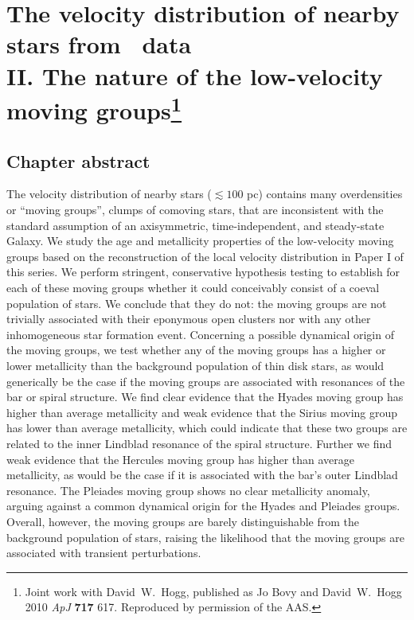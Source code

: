 
\chapter[The velocity distribution of nearby stars from \Hipparcos\ data II. The nature of the low-velocity moving groups]{The velocity distribution of nearby stars from \Hipparcos\ data\\
II. The nature of the low-velocity moving
groups\protect\footnote{Joint work with David~W.~Hogg, published as Jo
Bovy and David~W.~Hogg 2010 \emph{ApJ} {\bf 717} 617. Reproduced by
permission of the AAS.}}\label{chap:groups}

\section{Chapter abstract}
The velocity distribution of nearby stars ($\lesssim 100$ pc) contains
many overdensities or ``moving groups'', clumps of comoving stars,
that are inconsistent with the standard assumption of an axisymmetric,
time-independent, and steady-state Galaxy. We study the age and
metallicity properties of the low-velocity moving groups based on the
reconstruction of the local velocity distribution in Paper I of this
series. We perform stringent, conservative hypothesis testing to
establish for each of these moving groups whether it could conceivably
consist of a coeval population of stars. We conclude that they do not:
the moving groups are not trivially associated with their eponymous
open clusters nor with any other inhomogeneous star formation
event. Concerning a possible dynamical origin of the moving groups, we
test whether any of the moving groups has a higher or lower
metallicity than the background population of thin disk stars, as
would generically be the case if the moving groups are associated with
resonances of the bar or spiral structure. We find clear evidence that
the Hyades moving group has higher than average metallicity and weak
evidence that the Sirius moving group has lower than average
metallicity, which could indicate that these two groups are related to
the inner Lindblad resonance of the spiral structure. Further we find
weak evidence that the Hercules moving group has higher than average
metallicity, as would be the case if it is associated with the bar's
outer Lindblad resonance. The Pleiades moving group shows no clear
metallicity anomaly, arguing against a common dynamical origin for the
Hyades and Pleiades groups. Overall, however, the moving groups are
barely distinguishable from the background population of stars,
raising the likelihood that the moving groups are associated with
transient perturbations.


